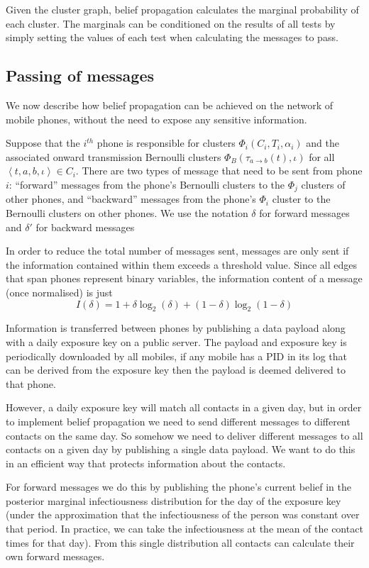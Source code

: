 \documentclass{article}
\begin{document}
Given the cluster graph, belief propagation calculates the marginal probability of each cluster. The marginals can be conditioned on the results of all tests by simply setting the values of each test when calculating the messages to pass.

\subsection{Passing of messages}

We now describe how belief propagation can be achieved on the network of mobile phones, without the need to expose any sensitive information.

Suppose that the $i^{th}$ phone is responsible for clusters $\Phi_i(C_i,T_i,\alpha_i)$ and the associated onward transmission Bernoulli clusters $\Phi_{B}(\tau_{a\rightarrow b}(t),\iota)$ for all $\left<t,a,b,\iota\right>\in C_i$. There are two types of message that need to be sent from phone $i$: ``forward'' messages from the phone's Bernoulli clusters to the $\Phi_j$ clusters of other phones, and ``backward'' messages from the phone's $\Phi_i$ cluster to the Bernoulli clusters on other phones. We use the notation $\delta$ for forward messages and $\delta'$ for backward messages

In order to reduce the total number of messages sent, messages are only sent if the information contained within them exceeds a threshold value. Since all edges that span phones represent binary variables, the information content of a message (once normalised) is just
\[
I(\delta) = 1 + \delta\log_2(\delta) + (1-\delta)\log_2(1-\delta)
\]

Information is transferred between phones by publishing a data payload along with a daily exposure key on a public server. The payload and exposure key is periodically downloaded by all mobiles, if any mobile has a PID in its log that can be derived from the exposure key then the payload is deemed delivered to that phone.

However, a daily exposure key will match all contacts in a given day, but in order to implement belief propagation we need to send different messages to different contacts on the same day. So somehow we need to deliver different messages to all contacts on a given day by publishing a single data payload. We want to do this in an efficient way that protects information about the contacts.

For forward messages we do this by publishing the phone's current belief in the posterior marginal infectiousness distribution for the day of the exposure key (under the approximation that the infectiousness of the person was constant over that period. In practice, we can take the infectiousness at the mean of the contact times for that day). From this single distribution all contacts can calculate their own forward messages.
\end{document}
